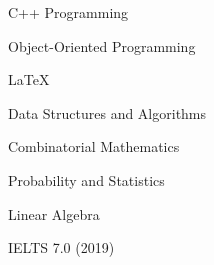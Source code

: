 \documentclass[11pt]{spidercv}
\begin{document}
    \begin{SideBar}{\ColorBackground}{\ColorTextSide}
        
        
        
        \vspace*{1cm}

        \begin{ItemList}{\ColorHighlight}
            \item [\faCode] C++ Programming
            \item [\faCode]  Object-Oriented Programming
            \item [\faCode] \LaTeX
            \item [\faPencilSquareO]  Data Structures and Algorithms
            \item [\faPencilSquareO]  Combinatorial Mathematics
            \item [\faPencilSquareO]  Probability and Statistics
            \item [\faPencilSquareO]  Linear Algebra
        \end{ItemList}

        \vspace*{1cm}


        \begin{SkillGauges}{\ColorHighlight}
            IELTS 7.0 (2019)
        \end{SkillGauges}
    \end{SideBar}

    

\end{document}
